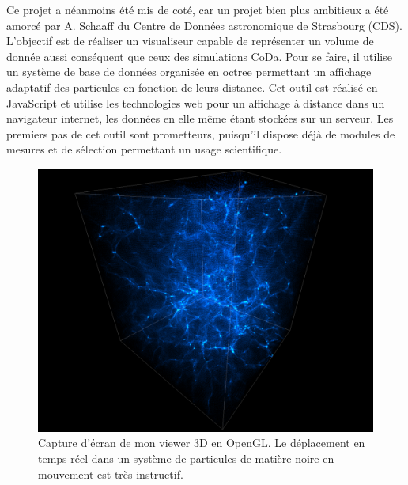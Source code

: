 Ce projet a néanmoins été mis de coté, car un projet bien plus ambitieux a été amorcé par A. Schaaff du Centre de Données astronomique de Strasbourg (CDS).
L'objectif est de réaliser un visualiseur capable de représenter un volume de donnée aussi conséquent que ceux des simulations CoDa.
Pour se faire, il utilise un système de base de données organisée en octree permettant un affichage adaptatif des particules en fonction de leurs distance.
Cet outil est réalisé en JavaScript et utilise les technologies web pour un affichage à distance dans un navigateur internet, les données en elle même étant stockées sur un serveur.
Les premiers pas de cet outil sont prometteurs, puisqu'il dispose déjà de modules de mesures et de sélection permettant un usage scientifique.




\begin{figure}
        \includegraphics[width=.95\linewidth]{img/04/part.png} 
        \caption[Projection 3D]{Capture d’écran de mon viewer 3D en OpenGL.
        Le déplacement en temps réel dans un système de particules de matière noire en mouvement est très instructif.}
 		\label{fig:viewer}
\end{figure}


%
%


